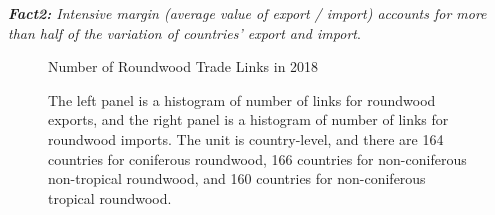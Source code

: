 \documentclass[a4paper,12pt]{article}
\begin{document}
\begin{table}[htbp]
 \end{table}

\textit{\textbf{Fact2:} Intensive margin (average value of export / import) accounts for more than half of the variation of countries' export and import}.

\begin{figure}[H]
    \centering
    \caption{Number of Roundwood Trade Links in 2018}
    \caption*{\small{The left panel is a histogram of number of links for roundwood exports, and the right panel is a histogram of number of links for roundwood imports. The unit is country-level, and there are 164 countries for coniferous roundwood, 166 countries for non-coniferous non-tropical roundwood, and 160 countries for non-coniferous tropical roundwood.}}
    \label{fig:num_of_trade_links}
\end{figure}
\end{document}
